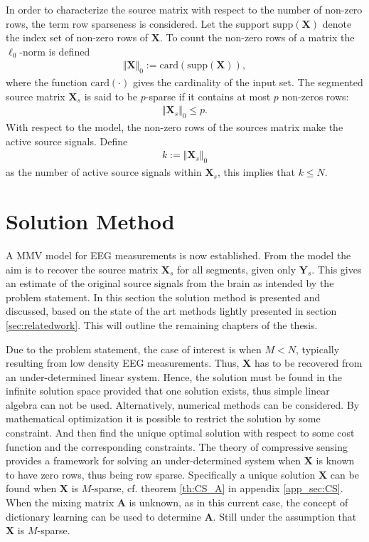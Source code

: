 In order to characterize the source matrix with respect to the number of non-zero rows, the term row sparseness is considered. 
Let the support $\text{supp}(\mathbf{X})$ denote the index set of non-zero rows of $\mathbf{X}$.
To count the non-zero rows of a matrix the $\ell_0$-norm is defined 
\begin{align*}
\Vert \mathbf{X} \Vert_0 := \text{card}(\text{supp}(\mathbf{X})),
\end{align*}
where the function $\text{card}(\cdot)$ gives the cardinality of the input set. The segmented source matrix $\mathbf{X}_s$ is said to be $p$-sparse if it contains at most $p$ non-zeros rows:
\begin{align*}
\Vert \mathbf{X}_s \Vert_0 \leq p.
\end{align*}
With respect to the model, the non-zero rows of the sources matrix make the active source signals. Define  
\begin{align*}
k := \Vert \mathbf{X}_s \Vert_0
\end{align*} 
as the number of active source signals within $\mathbf{X}_s$, this implies that $k \leq N$. 

\section{Solution Method}\label{sec:sol_met}
A MMV model for EEG measurements is now established.
From the model the aim is to recover the source matrix $\mathbf{X}_s$ for all segments, given only $\textbf{Y}_s$.
This gives an estimate of the original source signals from the brain as intended by the problem statement. 
In this section the solution method is presented and discussed, based on the state of the art methods lightly presented in section \ref{sec:relatedwork}. This will outline the remaining chapters of the thesis. 

Due to the problem statement, the case of interest is when $M < N$, typically resulting from low density EEG measurements. 
Thus, $\mathbf{X}$ has to be recovered from an under-determined linear system. 
Hence, the solution must be found in the infinite solution space provided that one solution exists, thus simple linear algebra can not be used. 
Alternatively, numerical methods can be considered. By mathematical optimization it is possible to restrict the solution by some constraint. And then find the unique optimal solution with respect to some cost function and the corresponding constraints.
The theory of compressive sensing provides a framework for solving an under-determined system when $\mathbf{X}$ is known to have zero rows, thus being row sparse. 
Specifically a unique solution $\mathbf{X}$ can be found when $\mathbf{X}$ is $M$-sparse, cf. theorem \ref{th:CS_A} in appendix \ref{app_sec:CS}. 
When the mixing matrix $\mathbf{A}$ is unknown, as in this current case, the concept of dictionary learning can be used to determine $\mathbf{A}$. Still under the assumption that $\mathbf{X}$ is $M$-sparse.  


